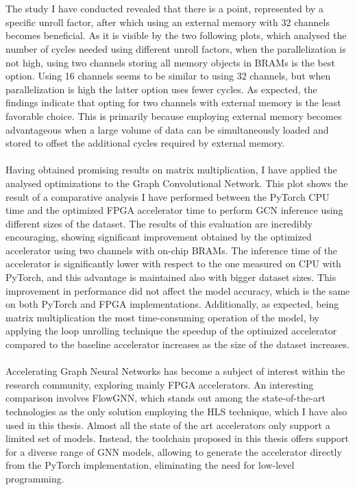 \documentclass{article}
\begin{document}
\\
\\
\noindent
The study I have conducted revealed that there is a point, represented by a specific unroll factor, after which using an external memory with 32 channels becomes beneficial.
As it is visible by the two following plots, which analysed the number of cycles needed using different unroll factors, when the parallelization is not high, using two channels storing all memory objects in BRAMs is the best option. Using 16 channels seems to be similar to using 32 channels, but when parallelization is high the latter option uses fewer cycles.
As expected, the findings indicate that opting for two channels with external memory is the least favorable choice. This is primarily because employing external memory becomes advantageous when a large volume of data can be simultaneously loaded and stored to offset the additional cycles required by external memory.
\\
\\
\noindent
Having obtained promising results on matrix multiplication, I have applied the analysed optimizations to the Graph Convolutional Network.
This plot shows the result of a comparative analysis I have performed between the PyTorch CPU time and the optimized FPGA accelerator time to perform GCN inference using different sizes of the dataset.
The results of this evaluation are incredibly encouraging, showing significant improvement obtained by the optimized accelerator using two channels with on-chip BRAMs.
The inference time of the accelerator is significantly lower with respect to the one measured on CPU with PyTorch, and this advantage is maintained also with bigger dataset sizes.
This improvement in performance did not affect the model accuracy, which is the same on both PyTorch and FPGA implementations.
Additionally, as expected, being matrix multiplication the most time-consuming operation of the model, by applying the loop unrolling technique the speedup of the optimized accelerator compared to the baseline accelerator increases as the size of the dataset increases.
\\
\\
\noindent
Accelerating Graph Neural Networks has become a subject of interest within the research community, exploring mainly FPGA accelerators.
An interesting comparison involves FlowGNN, which stands out among the state-of-the-art technologies as the only solution employing the HLS technique, which I have also used in this thesis.
Almost all the state of the art accelerators only support a limited set of models. Instead, the toolchain proposed in this thesis offers support for a diverse range of GNN models, allowing to generate the accelerator directly from the PyTorch implementation, eliminating the need for low-level programming.
\end{document}
